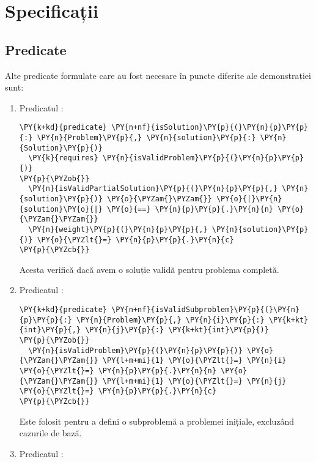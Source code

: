 \chapter{Specificații}
\begin{sloppypar}

\section{Predicate}
    Alte predicate formulate care au fost necesare în puncte diferite ale demonstrației sunt:
    \begin{enumerate}    
    \item Predicatul :
    \begin{Verbatim}[commandchars=\\\{\}]
\PY{k+kd}{predicate} \PY{n+nf}{isSolution}\PY{p}{(}\PY{n}{p}\PY{p}{:} \PY{n}{Problem}\PY{p}{,} \PY{n}{solution}\PY{p}{:} \PY{n}{Solution}\PY{p}{)}
  \PY{k}{requires} \PY{n}{isValidProblem}\PY{p}{(}\PY{n}{p}\PY{p}{)}
\PY{p}{\PYZob{}}
  \PY{n}{isValidPartialSolution}\PY{p}{(}\PY{n}{p}\PY{p}{,} \PY{n}{solution}\PY{p}{)} \PY{o}{\PYZam{}\PYZam{}} \PY{o}{|}\PY{n}{solution}\PY{o}{|} \PY{o}{==} \PY{n}{p}\PY{p}{.}\PY{n}{n} \PY{o}{\PYZam{}\PYZam{}}
  \PY{n}{weight}\PY{p}{(}\PY{n}{p}\PY{p}{,} \PY{n}{solution}\PY{p}{)} \PY{o}{\PYZlt{}=} \PY{n}{p}\PY{p}{.}\PY{n}{c}
\PY{p}{\PYZcb{}}
\end{Verbatim} 
    Acesta verifică dacă avem o soluție validă pentru problema completă.
    \item Predicatul :
    \begin{Verbatim}[commandchars=\\\{\}]
\PY{k+kd}{predicate} \PY{n+nf}{isValidSubproblem}\PY{p}{(}\PY{n}{p}\PY{p}{:} \PY{n}{Problem}\PY{p}{,} \PY{n}{i}\PY{p}{:} \PY{k+kt}{int}\PY{p}{,} \PY{n}{j}\PY{p}{:} \PY{k+kt}{int}\PY{p}{)}
\PY{p}{\PYZob{}}
  \PY{n}{isValidProblem}\PY{p}{(}\PY{n}{p}\PY{p}{)} \PY{o}{\PYZam{}\PYZam{}} \PY{l+m+mi}{1} \PY{o}{\PYZlt{}=} \PY{n}{i} \PY{o}{\PYZlt{}=} \PY{n}{p}\PY{p}{.}\PY{n}{n} \PY{o}{\PYZam{}\PYZam{}} \PY{l+m+mi}{1} \PY{o}{\PYZlt{}=} \PY{n}{j} \PY{o}{\PYZlt{}=} \PY{n}{p}\PY{p}{.}\PY{n}{c} 
\PY{p}{\PYZcb{}}
\end{Verbatim}
    Este folosit pentru a defini o subproblemă a problemei inițiale, excluzând cazurile de bază.
    \item Predicatul :
    \begin{Verbatim}[commandchars=\\\{\}]

\end{Verbatim}
\end{enumerate}
\end{sloppypar}
